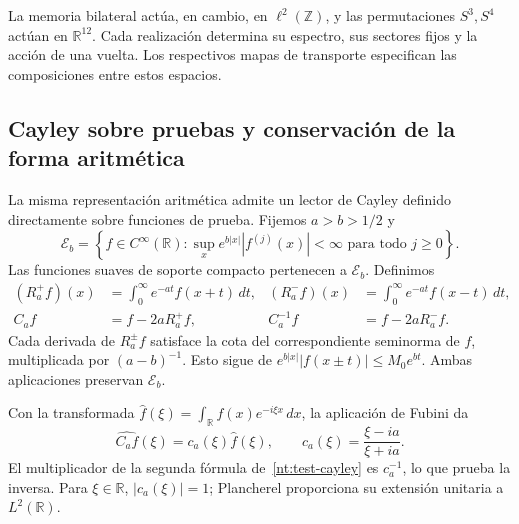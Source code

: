La memoria bilateral actúa, en cambio, en
\(\ell^2(\mathbb Z)\), y las permutaciones \(S^3,S^4\)
actúan en \(\mathbb R^{12}\). Cada realización determina
su espectro, sus sectores fijos y la acción de una vuelta.
Los respectivos mapas de transporte especifican las
composiciones entre estos espacios.

\subsection{Cayley sobre pruebas y conservación de la forma aritmética}

La misma representación aritmética admite un lector de Cayley
definido directamente sobre funciones de prueba. Fijemos
\(a>b>1/2\) y
\[
 \mathscr E_b=
 \left\{f\in C^\infty(\mathbb R):
   \sup_x e^{b|x|}|f^{(j)}(x)|<\infty
   \text{ para todo }j\geq0\right\}.
\]
Las funciones suaves de soporte compacto pertenecen a
\(\mathscr E_b\). Definimos
\begin{align}
 (R_a^+f)(x)&=\int_0^\infty e^{-at}f(x+t)\,dt,
 &(R_a^-f)(x)&=\int_0^\infty e^{-at}f(x-t)\,dt,\label{nt:resolvents}\\
 C_af&=f-2aR_a^+f,
 &C_a^{-1}f&=f-2aR_a^-f.\label{nt:test-cayley}
\end{align}
Cada derivada de \(R_a^\pm f\) satisface la cota del
correspondiente seminorma de \(f\), multiplicada por
\((a-b)^{-1}\). Esto sigue de
\(e^{b|x|}|f(x\pm t)|\leq M_0e^{bt}\).
Ambas aplicaciones preservan \(\mathscr E_b\).

Con la transformada
\(\widehat f(\xi)=\int_{\mathbb R}f(x)e^{-i\xi x}\,dx\),
la aplicación de Fubini da
\begin{equation}
 \widehat{C_af}(\xi)
 =c_a(\xi)\widehat f(\xi),\qquad
 c_a(\xi)=\frac{\xi-ia}{\xi+ia}.
 \label{nt:cayley-multiplier}
\end{equation}
El multiplicador de la segunda fórmula
de~\eqref{nt:test-cayley} es \(c_a^{-1}\), lo que prueba
la inversa. Para \(\xi\in\mathbb R\),
\(|c_a(\xi)|=1\); Plancherel proporciona su extensión
unitaria a \(L^2(\mathbb R)\).

